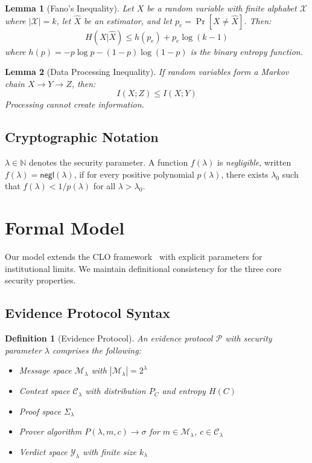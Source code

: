 \documentclass{ieeeaccess}
\newcommand{\negl}{\mathsf{negl}}
\newtheorem{lemma}{Lemma}[subsection]
\newtheorem{definition}{Definition}[subsection]
\begin{document}
\begin{lemma}[Fano's Inequality]\label{lem:fano}
Let $X$ be a random variable with finite alphabet $\mathcal{X}$ where $|\mathcal{X}| = k$, let $\hat{X}$ be an estimator, and let $p_e = \Pr[X \neq \hat{X}]$. Then:
\begin{equation}
H(X|\hat{X}) \leq h(p_e) + p_e\log(k-1)
\end{equation}
where $h(p) = -p\log p - (1-p)\log(1-p)$ is the binary entropy function.
\end{lemma}

\begin{lemma}[Data Processing Inequality]\label{lem:dpi}
If random variables form a Markov chain $X \to Y \to Z$, then:
\begin{equation}
I(X;Z) \leq I(X;Y)
\end{equation}
Processing cannot create information.
\end{lemma}

\subsection{Cryptographic Notation}

$\lambda \in \mathbb{N}$ denotes the security parameter. A function $f(\lambda)$ is \emph{negligible}, written $f(\lambda) = \negl(\lambda)$, if for every positive polynomial $p(\lambda)$, there exists $\lambda_0$ such that $f(\lambda) < 1/p(\lambda)$ for all $\lambda > \lambda_0$.

\section{Formal Model}\label{sec:model}

Our model extends the CLO framework~\cite{Minka2026CLO} with explicit parameters for institutional limits. We maintain definitional consistency for the three core security properties.

\subsection{Evidence Protocol Syntax}

\begin{definition}[Evidence Protocol]\label{def:protocol}
An \emph{evidence protocol} $\mathcal{P}$ with security parameter $\lambda$ comprises the following:
\begin{itemize}
\item Message space $\mathcal{M}_\lambda$ with $|\mathcal{M}_\lambda| = 2^\lambda$
\item Context space $\mathcal{C}_\lambda$ with distribution $P_C$ and entropy $H(C)$
\item Proof space $\Sigma_\lambda$
\item Prover algorithm $P(\lambda, m, c) \to \sigma$ for $m \in \mathcal{M}_\lambda$, $c \in \mathcal{C}_\lambda$
\item Verdict space $\mathcal{Y}_\lambda$ with finite size $k_\lambda$
\end{itemize}
\end{definition}
\end{document}
